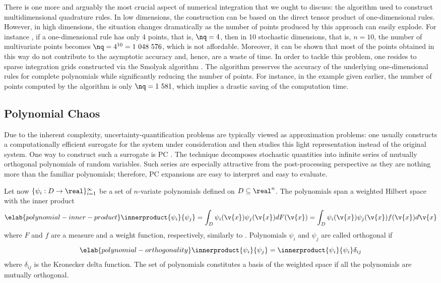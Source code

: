 There is one more and arguably the most crucial aspect of numerical integration
that we ought to discuss: the algorithm used to construct multidimensional
quadrature rules. In low dimensions, the construction can be based on the direct
tensor product of one-dimensional rules. However, in high dimensions, the
situation changes dramatically as the number of points produced by this approach
can easily explode. For instance \cite{heiss2008}, if a one-dimensional rule has
only 4 points, that is, $\nq = 4$, then in 10 stochastic dimensions, that is, $n
= 10$, the number of multivariate points becomes $\nq = 4^{10} = 1~048~576$,
which is not affordable. Moreover, it can be shown that most of the points
obtained in this way do not contribute to the asymptotic accuracy and, hence,
are a waste of time. In order to tackle this problem, one resides to sparse
integration grids constructed via the Smolyak algorithm \cite{burkardt,
eldred2008, heiss2008}. The algorithm preserves the accuracy of the underlying
one-dimensional rules for complete polynomials while significantly reducing the
number of points. For instance, in the example given earlier, the number of
points computed by the algorithm is only $\nq = 1~581$, which implies a drastic
saving of the computation time.

\subsection{Polynomial Chaos}

Due to the inherent complexity, uncertainty-quantification problems are
typically viewed as approximation problems: one usually constructs a
computationally efficient surrogate for the system under consideration and then
studies this light representation instead of the original system. One way to
construct such a surrogate is \ac{PC} \cite{xiu2010}. The technique decomposes
stochastic quantities into infinite series of mutually orthogonal polynomials of
random variables. Such series are especially attractive from the post-processing
perspective as they are nothing more than the familiar polynomials; therefore,
\ac{PC} expansions are easy to interpret and easy to evaluate.

Let now $\{ \psi_i: D \to \real \}_{i = 1}^\infty$ be a set of $n$-variate
polynomials defined on $D \subseteq \real^n$. The polynomials span a weighted
Hilbert space with the inner product
\begin{equation} \elab{polynomial-inner-product}
  \innerproduct{\psi_i}{\psi_j}
  = \int_D \psi_i(\v{x}) \psi_j(\v{x}) dF(\v{x})
  = \int_D \psi_i(\v{x}) \psi_j(\v{x}) f(\v{x}) d\v{x}
\end{equation}
where $F$ and $f$ are a measure and a weight function, respectively, similarly
to . Polynomials $\psi_i$ and $\psi_j$ are called
orthogonal if
\begin{equation} \elab{polynomial-orthogonality}
  \innerproduct{\psi_i}{\psi_j} = \innerproduct{\psi_i}{\psi_i} \delta_{ij}
\end{equation}
where $\delta_{ij}$ is the Kronecker delta function. The set of polynomials
constitutes a basis of the weighted space if all the polynomials are mutually
orthogonal.

